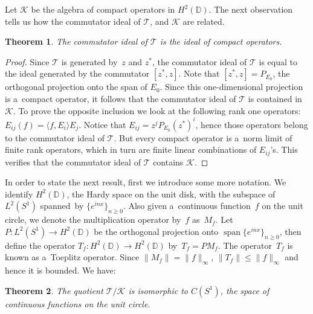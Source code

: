 \documentclass[pdftex]{sigma}
\numberwithin{equation}{section}
\newtheorem{Theorem}{Theorem}[section]
\DeclareMathOperator{\spn}{span}
\begin{document}
Let $\mathcal{K}$ be the algebra of compact operators in $H^2({\mathbb D})$.
The next observation tells us how the commutator ideal of $\mathcal{T}$, and $\mathcal{K}$ are related.

\begin{Theorem}
The commutator ideal of $\mathcal{T}$ is the ideal of compact operators.
\end{Theorem}

\begin{proof}
Since $\mathcal{T}$ is generated by~$z$ and $z^*$, the commutator ideal of $\mathcal{T}$ is equal to the ideal generated
by the commutator $[z^*,z]$.
Note that $[z^*,z]=P_{E_0}$, the orthogonal projection onto the span of $E_0$.
Since this one-dimensional projection is a~compact operator, it follows that the commutator ideal of $\mathcal{T}$ is
contained in $\mathcal{K}$.
To prove the opposite inclusion we look at the following rank one operators: $E_{ij}(f)=\langle f, E_i\rangle E_j$.
Notice that $E_{ij}=z^jP_{E_0}(z^*)^i$, hence those operators belong to the commutator ideal of $\mathcal{T}$.
But every compact operator is a~norm limit of f\/inite rank operators, which in turn are f\/inite linear combinations of
$E_{ij}$'s.
This verif\/ies that the commutator ideal of $\mathcal{T}$ contains $\mathcal{K}$.
\end{proof}

In order to state the next result, f\/irst we introduce some more notation.
We identify $H^2({\mathbb D})$, the Hardy space on the unit disk, with the subspace of $L^2(S^1)$ spanned~by
$\{e^{inx}\}_{n\ge0}$.
Also given a~continuous function~$f$ on the unit circle, we denote the multiplication operator by~$f$ as~$M_f$.
Let $P:L^2(S^1)\to H^2({\mathbb D})$ be the orthogonal projection onto $\spn\{e^{inx}\}_{n\ge0}$, then def\/ine
the operator $T_f: H^2({\mathbb D}) \to H^2({\mathbb D})$ by~$T_f=PM_f$.
The operator~$T_f$ is known as a~Toeplitz operator.
Since $\|M_f\|=\|f\|_{\infty}$, $\|T_f\|\le \|f\|_{\infty}$ and hence it is bounded.
We have:

\begin{Theorem}
\label{toeplitz_disk}
The quotient $\mathcal{T}/\mathcal{K}$ is isomorphic to $C(S^1)$, the space of continuous functions on the unit circle.
\end{Theorem}
\end{document}
